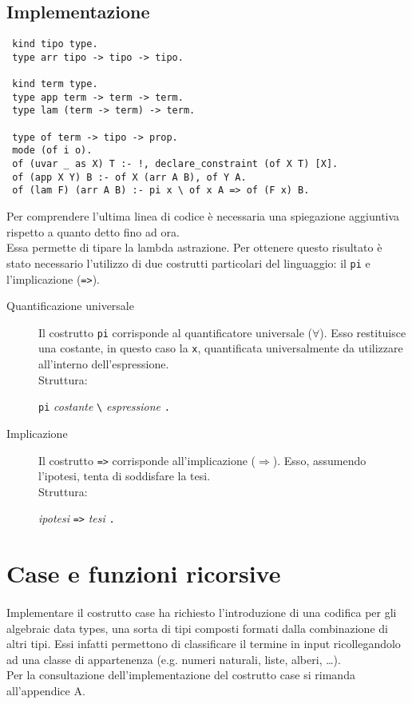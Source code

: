 \documentclass[12pt,a4paper,openright,twoside]{report}
\begin{document}
\subsection{Implementazione}
\begin{verbatim}
 kind tipo type.
 type arr tipo -> tipo -> tipo.

 kind term type.
 type app term -> term -> term.
 type lam (term -> term) -> term.

 type of term -> tipo -> prop.
 mode (of i o).
 of (uvar _ as X) T :- !, declare_constraint (of X T) [X].
 of (app X Y) B :- of X (arr A B), of Y A.
 of (lam F) (arr A B) :- pi x \ of x A => of (F x) B.
\end{verbatim}
Per comprendere l'ultima linea di codice è necessaria una spiegazione aggiuntiva rispetto a quanto detto fino ad ora.\\
Essa permette di tipare la lambda astrazione. Per ottenere questo risultato è stato necessario l'utilizzo di due costrutti particolari del linguaggio: il \verb"pi" e l'implicazione (\verb"=>").\\
\begin{description}
 \item[Quantificazione universale] Il costrutto \verb"pi" corrisponde al quantificatore universale ($\forall$). Esso restituisce una costante, in questo caso la \verb"x", quantificata universalmente da utilizzare all'interno dell'espressione.\\
 Struttura:
 \begin{center}
  \verb"pi" \textit{costante} \verb"\" \textit{espressione} \verb"."
 \end{center}
 \item[Implicazione] Il costrutto \verb"=>" corrisponde all'implicazione ($\Rightarrow$). Esso, assumendo l'ipotesi, tenta di soddisfare la tesi.\\
 Struttura:
 \begin{center}
  \textit{ipotesi} \verb"=>" \textit{tesi} \verb"."
 \end{center}
\end{description}

\section{Case e funzioni ricorsive}

\paragraph{}
Implementare il costrutto case ha richiesto l'introduzione di una codifica per gli algebraic data types, una sorta di tipi composti formati dalla combinazione di altri tipi. Essi infatti permettono di classificare il termine in input ricollegandolo ad una classe di appartenenza (e.g. numeri naturali, liste, alberi, \ldots).\\
Per la consultazione dell'implementazione del costrutto case si rimanda all'appendice A.
\end{document}
